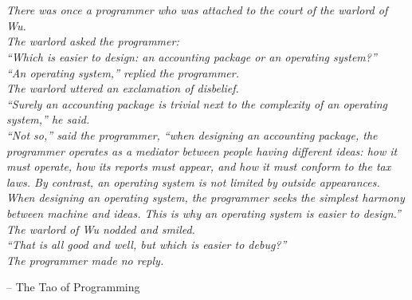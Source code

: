 \chapter*{}
\begin{flushright}
\begin{minipage}{.75\textwidth}
\thispagestyle{empty}
\itshape{ 
There was once a programmer who was attached to the court of the warlord of Wu.\\
The warlord asked the programmer: \\
“Which is easier to design: an accounting package or an operating system?”\\
“An operating system,” replied the programmer.\\
The warlord uttered an exclamation of disbelief.\\ 
“Surely an accounting package is trivial next to the complexity of an operating
system,” he said. \\
“Not so,” said the programmer, “when designing an accounting package, the programmer
operates as a mediator between people having different ideas: how it must
operate, how its reports must appear, and how it must conform to the tax laws.
By contrast, an operating system is not limited by outside appearances. When
designing an operating system, the programmer seeks the simplest harmony between
machine and ideas. This is why an operating system is easier to design.”\\ The
warlord of Wu nodded and smiled.\\ “That is all good and well, but which is easier
to debug?”\\ The programmer made no reply.\\}
\begin{flushright}
-- The Tao of Programming
\end{flushright}
\end{minipage}
\end{flushright}
